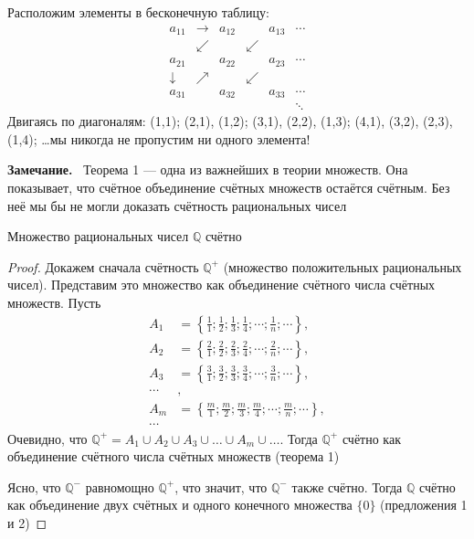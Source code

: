 \documentclass[a4paper,12pt]{article}
\newcommand{\myremark}{\textbf{Замечание.}\ }
\theoremstyle{definition}
\theoremstyle{plain}
\theoremstyle{remark}
\begin{document}
	\begin{tcolorbox}[colback=blue!5, colframe=blue!40!black, title=Наглядная иллюстрация диагонального метода]
		Расположим элементы в бесконечную таблицу:
		\[
		\begin{array}{cccccc}
			a_{11} & \rightarrow & a_{12} &  & a_{13} & \cdots \\
			& \swarrow &  & \swarrow &  & \\
			a_{21} &  & a_{22} &  & a_{23} & \cdots \\
			\downarrow & \nearrow &  & \swarrow &  & \\
			a_{31} &  & a_{32} &  & a_{33} & \cdots \\
			&  &  &  &  & \ddots
		\end{array}
		\]
		Двигаясь по диагоналям: (1,1); (2,1), (1,2); (3,1), (2,2), (1,3); (4,1), (3,2), (2,3), (1,4); \dots мы никогда не пропустим ни одного элемента!
	\end{tcolorbox}
	
	\myremark
	Теорема 1 — одна из важнейших в теории множеств. Она показывает, что счётное объединение счётных множеств остаётся счётным. Без неё мы бы не могли доказать счётность рациональных чисел
	
	\bigskip
	\begin{tcolorbox}[colback=red!5, colframe=red!70!black, title=Теорема 2]
		Множество рациональных чисел $\mathbb{Q}$ счётно
	\end{tcolorbox}
	
	\begin{proof}
		Докажем сначала счётность $\mathbb{Q}^+$ (множество положительных рациональных чисел).
		Представим это множество как объединение счётного числа счётных множеств. Пусть
		\begin{align*}
			A_1 &= \left\{ \frac{1}{1}; \frac{1}{2}; \frac{1}{3}; \frac{1}{4}; \cdots; \frac{1}{n}; \cdots \right\}, \\
			A_2 &= \left\{ \frac{2}{1}; \frac{2}{2}; \frac{2}{3}; \frac{2}{4}; \cdots; \frac{2}{n}; \cdots \right\}, \\
			A_3 &= \left\{ \frac{3}{1}; \frac{3}{2}; \frac{3}{3}; \frac{3}{4}; \cdots; \frac{3}{n}; \cdots \right\}, \\
			\cdots &, \\
			A_m &= \left\{ \frac{m}{1}; \frac{m}{2}; \frac{m}{3}; \frac{m}{4}; \cdots; \frac{m}{n}; \cdots \right\}, \\
			\cdots &
		\end{align*}
		Очевидно, что $\mathbb{Q}^+ = A_1 \cup A_2 \cup A_3 \cup \dots \cup A_m \cup \dots$. Тогда $\mathbb{Q}^+$ счётно как объединение счётного числа счётных множеств (теорема 1)
		
		\medskip
		Ясно, что $\mathbb{Q}^-$ равномощно $\mathbb{Q}^+$, что значит, что $\mathbb{Q}^-$ также счётно. Тогда $\mathbb{Q}$ счётно как объединение двух счётных и одного конечного множества $\{0\}$ (предложения 1 и 2)
	\end{proof}
	
\end{document}
